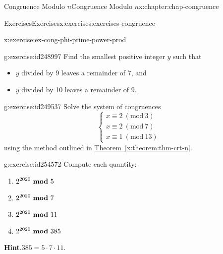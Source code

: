 \documentclass[oneside,10pt,]{book}
\newcommand{\blocktitlefont}{\relax}
\newcommand{\xreffont}{\relax}
\numberwithin{equation}{section}
\newcommand{\Mod}[1]{\ \left(\mathrm{mod}\ #1\right)}
\newcommand{\mmod}[1]{\ \mathrm{\bf mod}\ #1}
\begin{document}
\begin{chapterptx}{Congruence Modulo \(n\)}{}{Congruence Modulo \(n\)}{}{}{x:chapter:chap-congruence}
\begin{exercises-section}{Exercises}{}{Exercises}{}{}{x:exercises:exercises-congruence}
\begin{divisionexercise}{16}{}{}{x:exercise:ex-cong-phi-prime-power-prod}
\end{divisionexercise}%
\begin{divisionexercise}{17}{}{}{g:exercise:id248997}%
Find the smallest positive integer \(y\) such that%
\begin{itemize}[label=\textbullet]
\item{}\(y\) divided by 9 leaves a remainder of 7, and%
\item{}\(y\) divided by 10 leaves a remainder of 9.%
\end{itemize}
%
\end{divisionexercise}%
\begin{divisionexercise}{18}{}{}{g:exercise:id249537}%
Solve the system of congruences%
\begin{equation*}
\begin{cases} x \equiv 2 \Mod{3} \\
x \equiv 2 \Mod{7} \\
x \equiv 1 \Mod{13} \end{cases}
\end{equation*}
using the method outlined in \hyperref[x:theorem:thm-crt-n]{Theorem~{\xreffont\ref{x:theorem:thm-crt-n}}}.%
\end{divisionexercise}%
\begin{divisionexercise}{19}{}{}{g:exercise:id254572}%
Compute each quantity:%
\begin{enumerate}[label=(\alph*)]
\item{}\(\displaystyle 2^{2020} \mmod{5}\)%
\item{}\(\displaystyle 2^{2020} \mmod{7}\)%
\item{}\(\displaystyle 2^{2020} \mmod{11}\)%
\item{}\(\displaystyle 2^{2020} \mmod{385}\)%
\end{enumerate}
%
\par\smallskip%
\noindent\textbf{\blocktitlefont Hint}.\hypertarget{g:hint:id254869}{}\quad{}\(385 = 5 \cdot 7 \cdot 11\).%
\end{divisionexercise}%
\end{exercises-section}
\end{chapterptx}
%
%
\typeout{************************************************}
\typeout{************************************************}
%
\end{document}
